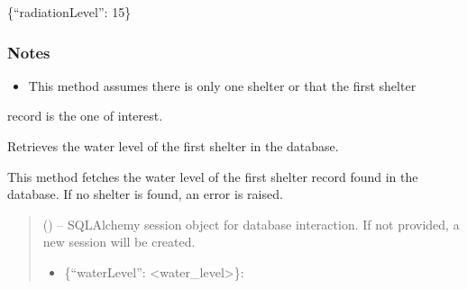 \documentclass[letterpaper,10pt,english]{sphinxmanual}
\begin{document}
\begin{fulllineitems}
\begin{fulllineitems}
\begin{quote}
\begin{description}
\end{description}\end{quote}
\begin{description}
\sphinxAtStartPar
\{“radiationLevel”: 15\}

\end{description}
\subsubsection*{Notes}
\begin{itemize}
\item {} 
\sphinxAtStartPar
This method assumes there is only one shelter or that the first shelter

\end{itemize}

\sphinxAtStartPar
record is the one of interest.

\end{fulllineitems}


\begin{fulllineitems}
\label{\detokenize{app.controllers:app.controllers.shelter_controller.ShelterController.get_shelter_water_level}}
\pysigstartsignatures
\pysiglinewithargsret
{}
{}
{}
\pysigstopsignatures
\sphinxAtStartPar
Retrieves the water level of the first shelter in the database.

\sphinxAtStartPar
This method fetches the water level of the first shelter record found in the database.
If no shelter is found, an error is raised.
\begin{quote}\begin{description}
\sphinxAtStartPar
{} (\sphinxstyleliteralemphasis{\sphinxupquote{, }}) – SQLAlchemy session object for database interaction.
If not provided, a new session will be created.

\sphinxAtStartPar
\begin{description}
\begin{itemize}
\item {} 
\sphinxAtStartPar
\{“waterLevel”: <water\_level>\}:


\end{itemize}
\end{description}
\end{description}
\end{quote}
\end{fulllineitems}
\end{fulllineitems}
\end{document}
